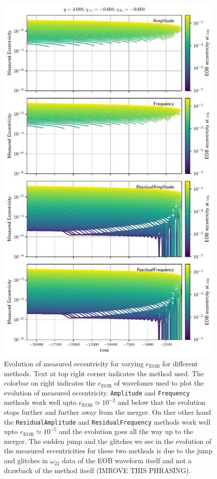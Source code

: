 \documentclass[aps,prd,amsmath,floats,floatfix, twocolumn,
superscriptaddress,nofootinbib,showpacs]{revtex4-1}
\begin{document}
\begin{figure}[thb]
\includegraphics[width=\columnwidth]{test_measured_ecc_vs_time_example}
\caption{Evolution of measured eccentricity for varying $e_{\text{EOB}}$ for different methods. Text at top right corner indicates the method used. The colorbar on right indicates the $e_{\text{EOB}}$ of wavefomrs used to plot the evolution of measured eccentricity. \texttt{Amplitude} and \texttt{Frequency} methods work well upto $e_{\text{EOB}} \simeq 10^{-2}$ and below that the evolution stops further and further away from the merger. On ther other hand the \texttt{ResidualAmplitude} and \texttt{ResidualFrequency} methods work well upto $e_{\text{EOB}} \simeq 10^{-5}$ and the evolution goes all the way up to the merger. The sudden jump and the glitches we see in the evolution of the measured eccentricities for these two methods is due to the jump and glitches in $\omega_{22}$ data of the EOB waveform itself and not a drawback of the method itself (IMROVE THIS PHRASING).}
\label{fig:measured_ecc_vs_time}
\end{figure}
\end{document}
